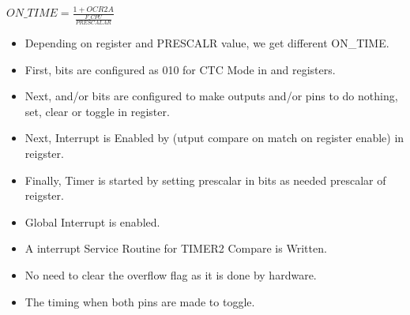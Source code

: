\documentclass{article}
\begin{document}
\begin{center}
    $ON\_TIME = \frac{1 + OCR2A}{\frac{F\_CPU}{PRESCALAR}}$
\end{center}
\begin{itemize}
    \item Depending on  register and PRESCALR value, we get different ON\_TIME.
    \item First,  bits are configured as 010 for CTC Mode in  and  registers.
    \item Next,  and/or  bits are configured to make outputs  and/or  pins to do nothing, set, clear or toggle in  register.
    \item Next, Interrupt is Enabled by  (utput compare on match on  register enable) in  reigster.
    \item Finally, Timer is started by setting prescalar in  bits as needed prescalar of  reigster.
    \item Global Interrupt is enabled.
    \item A interrupt Service Routine for TIMER2 Compare is Written.
    \item No need to clear the overflow flag as it is done by hardware.
    \item The timing when both pins  are made to toggle.
\end{itemize}
\end{document}
